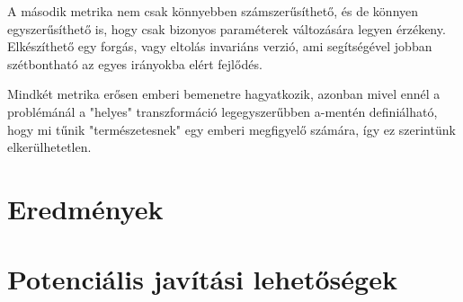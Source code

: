 A második metrika nem csak könnyebben számszerűsíthető, és de könnyen egyszerűsíthető is, hogy csak bizonyos paraméterek változására legyen érzékeny.
Elkészíthető egy forgás, vagy eltolás invariáns verzió, ami segítségével jobban szétbontható az egyes irányokba elért fejlődés.

Mindkét metrika erősen emberi bemenetre hagyatkozik, azonban mivel ennél a problémánál a "helyes" transzformáció legegyszerűbben a-mentén definiálható, hogy mi tűnik "természetesnek" egy emberi megfigyelő számára, így ez szerintünk elkerülhetetlen.

\section{Eredmények}

\section{Potenciális javítási lehetőségek}

